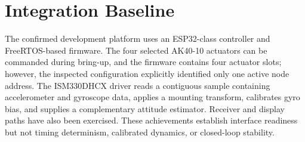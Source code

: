 \section{Integration Baseline}\label{integration-baseline}

The confirmed development platform uses an ESP32-class controller and
FreeRTOS-based firmware. The four selected AK40-10 actuators can be
commanded during bring-up, and the firmware contains four actuator
slots; however, the inspected configuration explicitly identified only
one active node address. The ISM330DHCX driver reads a contiguous sample
containing accelerometer and gyroscope data, applies a mounting
transform, calibrates gyro bias, and supplies a complementary attitude
estimator. Receiver and display paths have also been exercised. These
achievements establish interface readiness but not timing determinism,
calibrated dynamics, or closed-loop stability.

